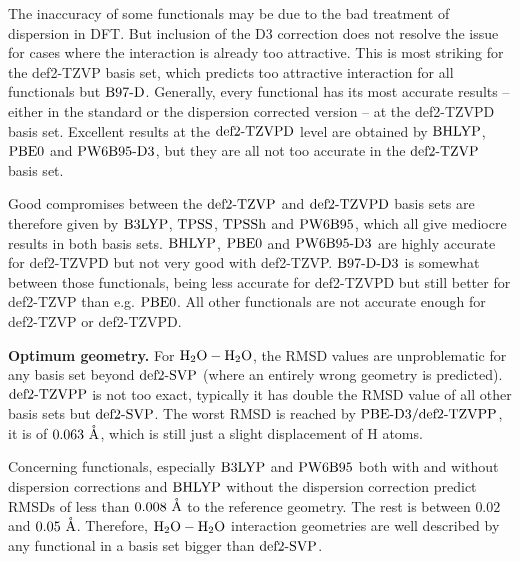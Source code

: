 The inaccuracy of some functionals may be due to the bad treatment of
dispersion in DFT. But inclusion of the D3 correction does not resolve the issue for cases
where the interaction is already too attractive. This
is most striking for the def2-TZVP basis set, which predicts too attractive
interaction for all functionals but $\text{B97-D}$. Generally, every functional has its
most accurate results -- either in the standard or the dispersion corrected version --
at the def2-TZVPD basis set. Excellent
results at the $\text{def2-TZVPD}$ level are obtained by $\text{BHLYP}$, $\text{PBE0}$ and $\text{PW6B95}\text{-D3}$,
but they are all not too accurate in the $\text{def2-TZVP}$ basis set.  

Good compromises between the $\text{def2-TZVP}$ and $\text{def2-TZVPD}$ basis sets
are therefore given by $\text{B3LYP}$, $\text{TPSS}$, $\text{TPSSh}$ and $\text{PW6B95}$, which all give
mediocre results in both basis sets. $\text{BHLYP}$, $\text{PBE0}$ and $\text{PW6B95}\text{-D3}$ are highly
accurate for def2-TZVPD but not very good with def2-TZVP. $\text{B97-D}\text{-D3}$ is somewhat
between those functionals, being less accurate for def2-TZVPD but still better
for def2-TZVP than e.g. $\text{PBE0}$. All other functionals are not accurate enough
for def2-TZVP or def2-TZVPD.

\textbf{Optimum geometry.} For $\mbox{\ensuremath{\text H _2 \text O-\text H _2 \text O}}$, the RMSD values are 
unproblematic for any basis set beyond $\text{def2-SVP}$ (where an entirely wrong geometry
is predicted). $\text{def2-TZVPP}$ is not too exact, typically it has double the
RMSD value of all other basis sets but $\text{def2-SVP}$. The worst RMSD is reached by
$\text{PBE}\text{-D3}/\text{def2-TZVPP}$, it is of \mbox{$0.063\ \mathring{\text{A}}$}, which is still just a slight
displacement of H atoms.

Concerning functionals, especially $\text{B3LYP}$ and $\text{PW6B95}$ both with
and without dispersion corrections and $\text{BHLYP}$ without the dispersion
correction predict RMSDs of less than $0.008\ \mathring{\text{A}}$ to the reference geometry.
The rest is between $0.02$ and $0.05\ \mathring{\text{A}}$. Therefore, $\mbox{\ensuremath{\text H _2 \text O-\text H _2 \text O}}$ interaction
geometries are well described by any functional in a basis set bigger than
$\text{def2-SVP}$.


